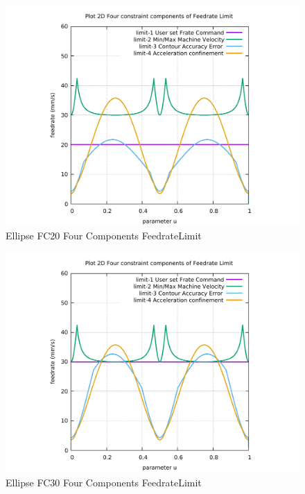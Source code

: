 \begin{figure}
	\caption     {Ellipse FC20 Four Components FeedrateLimit}
	\label{32-img-Ellipse-FC20-Four-Components-FeedrateLimit.pdf}
	\includegraphics[width=1.00\textwidth]{Chap4/appendix/app-Ellipse/plots/32-img-Ellipse-FC20-Four-Components-FeedrateLimit.pdf}
\end{figure}


\clearpage
\pagebreak

\begin{figure}
	\caption     {Ellipse FC30 Four Components FeedrateLimit}
	\label{33-img-Ellipse-FC30-Four-Components-FeedrateLimit.pdf}
	\includegraphics[width=1.00\textwidth]{Chap4/appendix/app-Ellipse/plots/33-img-Ellipse-FC30-Four-Components-FeedrateLimit.pdf}
\end{figure}


